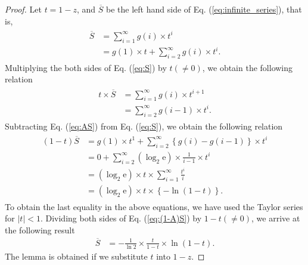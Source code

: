 \begin{proof}
Let $t=1-z$, and $\overline{S}$ be the left hand side of Eq. (\ref{eq:infinite_series}), that is,
\begin{align}\begin{split}\label{eq:S}
  \overline{S} &= \sum_{i=1}^{\infty} g(i) \times t^i \\
    &= g(1)\times t +  \sum_{i=2}^{\infty} g(i) \times t^{i}.
\end{split}\end{align}
Multiplying the both sides of Eq. (\ref{eq:S}) by $t(\neq 0)$, we obtain the following relation
\begin{align}\begin{split}\label{eq:AS}
  t\times \overline{S} &= \sum_{i=1}^{\infty} g(i) \times t^{i+1} \\
  &= \sum_{i=2}^{\infty} g(i-1) \times t^{i}.
\end{split}\end{align}
Subtracting Eq. (\ref{eq:AS}) from Eq. (\ref{eq:S}), we obtain the following relation
\begin{align}\begin{split}\label{eq:(1-A)S}
  (1-t)\overline{S} &= g(1)\times t^{1} + \sum_{i=2}^{\infty} \left\{ g(i)-g(i-1) \right\} \times t^{i} \\
  &=0 + \sum_{i=2}^{\infty} (\log_2 \mathrm{e}) \times \frac{1}{i-1} \times t^{i} \\
  &=(\log_2 \mathrm{e})\times t \times \sum_{i=1}^{\infty} \frac{t^{i}}{i} \\
  &=(\log_2 \mathrm{e})\times t \times \left\{ - \ln (1-t) \right\}.
\end{split}\end{align}
To obtain the last equality in the above equations, we have used the Taylor series for $|t| < 1$.
Dividing both sides of Eq. (\ref{eq:(1-A)S}) by $1-t (\neq 0)$, we arrive at the following result
\begin{align}
  \overline{S} &= -\frac{1}{\ln 2} \times \frac{t}{1-t} \times \ln (1-t).
\end{align}
The lemma is obtained if we substitute $t$ into $1-z$.
\end{proof}
